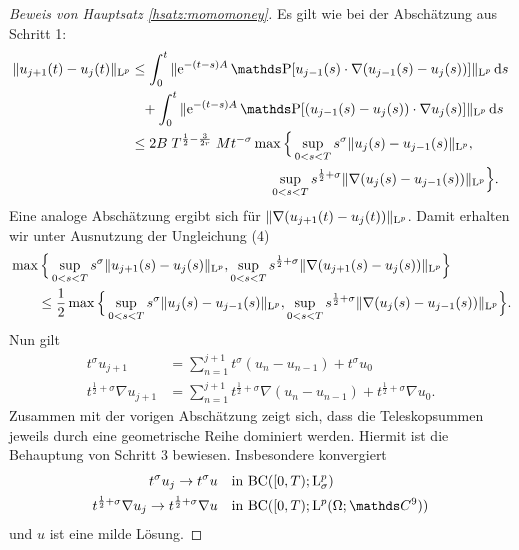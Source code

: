 \begin{proof}[Beweis von Hauptsatz \ref{hsatz:momomoney}]
  Es gilt wie bei der Abschätzung aus Schritt 1:
  \begin{align*}
    \|u_{j + 1}(t) - u_j(t)\|_{\Ell^p}
    &\leq \int_0^t \|\e^{-(t - s) A} \PP[ u_{j - 1}(s) \cdot \nabla (u_{j - 1}(s) - u_j(s))] \|_{\Ell^p} \d s \\
    &\hphantom{\leq} + \int_0^t \|\e^{-(t - s)A} \PP[ (u_{j - 1}(s) - u_j(s)) \cdot \nabla u_j(s) ] \|_{\Ell^p} \d s \\
    &\leq 2B \; T^{\frac{1}{2} - \frac{3}{2r}} \;M t^{-\sigma} \max\Big\{ \sup_{0 < s < T} s^\sigma \|u_j(s) - u_{j - 1}(s) \|_{\Ell^p},\\
    &\hphantom{2B M\; T^{\frac{1}{2} - \frac{3}{2r}} t^{-\sigma} \max\Big\{ }
    \sup_{0 < s < T} s^{\frac{1}{2} + \sigma} \|\nabla(u_j(s) - u_{j - 1}(s)) \|_{\Ell^p} \Big\}.
  \end{align*}
  Eine analoge Abschätzung ergibt sich für $\|\nabla(u_{j + 1}(t) - u_j(t)) \|_{\mathrm{L}^p}$.
  Damit erhalten wir unter Ausnutzung der Ungleichung (4)
  \begin{align*}
    &\max\Big\{\sup_{0 < s < T} s^\sigma \| u_{j + 1}(s) - u_j(s) \|_{\mathrm{L}^p}, \sup_{0 < s < T} s^{\frac{1}{2} + \sigma} \|\nabla(u_{j + 1}(s) - u_j(s)) \|_{\mathrm{L}^p} \Big\} \\
    &\qquad\leq
    \frac{1}{2}
    \max\Big\{\sup_{0 < s < T} s^\sigma \| u_{j}(s) - u_{j - 1}(s) \|_{\mathrm{L}^p}, \sup_{0 < s < T} s^{\frac{1}{2} + \sigma} \|\nabla(u_{j}(s) - u_{j - 1}(s)) \|_{\mathrm{L}^p} \Big\}.
  \end{align*}
  Nun gilt 
  \begin{align*}
    t^\sigma u_{j + 1} &= \sum_{n = 1}^{j + 1} t^\sigma (u_n - u_{n - 1}) + t^\sigma u_0 \\
    t^{\frac{1}{2} + \sigma} \nabla u_{j + 1} &= \sum_{n = 1}^{j + 1} t^{\frac{1}{2} + \sigma} \nabla (u_n - u_{n - 1}) + t^{\frac{1}{2} + \sigma} \nabla u_0.
  \end{align*}
  Zusammen mit der vorigen Abschätzung zeigt sich, dass die Teleskopsummen jeweils durch eine geometrische Reihe dominiert werden.
  Hiermit ist die Behauptung von Schritt 3 bewiesen.
  Insbesondere konvergiert
  \begin{align*}
    t^\sigma u_j \to t^\sigma u &\quad\text{in } \mathrm{BC}([0,T); \Ell^p_\sigma) \\
      t^{\frac{1}{2} + \sigma} \nabla u_j \to t^{\frac{1}{2} + \sigma} \nabla u &\quad\text{in } \mathrm{BC}([0,T); \Ell^p(\Omega; \C^9))
  \end{align*}
  und $u$ ist eine milde Lösung.


\end{proof}
